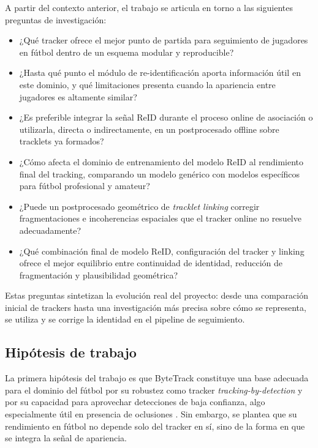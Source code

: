 \documentclass[../MAIN.tex]{subfiles}
\begin{document}
A partir del contexto anterior, el trabajo se articula en torno a las siguientes preguntas de investigación:

\begin{itemize}
	\item ¿Qué tracker ofrece el mejor punto de partida para seguimiento de jugadores en fútbol dentro de un esquema modular y reproducible?
	\item ¿Hasta qué punto el módulo de re-identificación aporta información útil en este dominio, y qué limitaciones presenta cuando la apariencia entre jugadores es altamente similar?
	\item ¿Es preferible integrar la señal ReID durante el proceso online de asociación o utilizarla, directa o indirectamente, en un postprocesado offline sobre tracklets ya formados?
	\item ¿Cómo afecta el dominio de entrenamiento del modelo ReID al rendimiento final del tracking, comparando un modelo genérico con modelos específicos para fútbol profesional y amateur?
	\item ¿Puede un postprocesado geométrico de \textit{tracklet linking} corregir fragmentaciones e incoherencias espaciales que el tracker online no resuelve adecuadamente?
	\item ¿Qué combinación final de modelo ReID, configuración del tracker y linking ofrece el mejor equilibrio entre continuidad de identidad, reducción de fragmentación y plausibilidad geométrica?
\end{itemize}

Estas preguntas sintetizan la evolución real del proyecto: desde una comparación inicial de trackers hasta una investigación más precisa sobre cómo se representa, se utiliza y se corrige la identidad en el pipeline de seguimiento.

\subsection{Hipótesis de trabajo}

La primera hipótesis del trabajo es que ByteTrack constituye una base adecuada para el dominio del fútbol por su robustez como tracker \textit{tracking-by-detection} y por su capacidad para aprovechar detecciones de baja confianza, algo especialmente útil en presencia de oclusiones \parencite{zhang2022bytetrack}. Sin embargo, se plantea que su rendimiento en fútbol no depende solo del tracker en sí, sino de la forma en que se integra la señal de apariencia.
\end{document}
